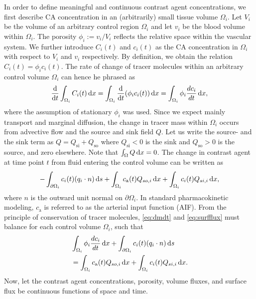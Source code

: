 \documentclass[journal,twocolumn]{IEEEtran}
\newcommand{\Qso}{Q_{\mathrm{so}}}
\newcommand{\Qsi}{Q_{\mathrm{si}}}
\newcommand{\ca}{c_\mathrm{a}}
\begin{document}
	In order to define meaningful and continuous contrast agent concentrations, we first describe CA concentration in an (arbitrarily) small tissue volume $\Omega_i$.
	Let $V_i$ be the volume of an arbitrary control region $\Omega_i$ and let $v_i$ be the blood volume within $\Omega_i$.
	The porosity $\phi_i := v_i/V_i$ reflects the relative space within the vascular system.
	We further introduce $C_i(t)$ and $c_i(t)$ as the CA concentration in $\Omega_i$ with respect to $V_i$ and $v_i$ respectively.
	By definition, we obtain the relation $C_i(t) = \phi_i  c_i(t)$.
	The rate of change of tracer molecules within an arbitrary control volume $\Omega_i$ can hence he phrased as
	\begin{equation}
		\diffop{t}\int_{\Omega_i}C_i(t) \diffint x = \int_{\Omega_i}\diffop{t}(\phi_i c_i(t)) \diffint x = \int_{\Omega_i} \phi_i \frac{d c_i}{dt}\diffint x,
		\label{eq:dmdt}
	\end{equation}	
	where the assumption of stationary $\phi_i$ was used.
	Since we expect mainly transport and marginal diffusion, the change in tracer mass within $\Omega_i$ occurs from advective flow and the source and sink field $Q$.
	Let us write the source- and the sink term as $Q = \Qsi + \Qso$ where $\Qsi < 0$ is the sink and $\Qso > 0$ is the source, and zero elsewhere. 
	Note that $\int_\Omega Q \,\mathrm{d} x = 0$. 
	The change in contrast agent at time point $t$ from fluid entering the control volume can be written as
	\begin{equation}
		-\int_{ \partial \Omega_i}c_i(t)(q_i \cdot n)\diffint s + \int_{\Omega_i}\ca(t) Q_{so,i} \diffint x + \int_{\Omega_i}c_i(t)Q_{si,i} \diffint x,
		\label{eq:surfflux}
	\end{equation}
	where $n$ is the outward unit normal on $\partial \Omega_i$.
	In standard pharmacokinetic modeling, $\ca$ is referred to as the arterial input function (AIF).
	From the principle of conservation of tracer molecules, \eqref{eq:dmdt} and \eqref{eq:surfflux} must balance for each control volume $\Omega_i$, such that
	\begin{align}
		& \int_{\Omega_i} \phi_i \frac{d c_i}{dt} \diffint x + \int_{ \partial \Omega_i}c_i(t)(q_i \cdot n) \diffint s \nonumber \\
		& = \int_{\Omega_i}\ca(t)Q_{so,i} \diffint x + \int_{\Omega_i}c_i(t) Q_{si,i} \diffint x.
		\label{eq:conteq}
	\end{align}
	Now, let the contrast agent concentrations, porosity, volume fluxes, and surface flux be continuous functions of space and time. 
\end{document}
